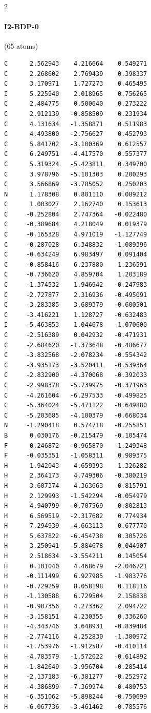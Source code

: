 \begin{multicols}{2}
\paragraph{I2-BDP-0} (65 atoms)
{\scriptsize\linespread{1}\selectfont\begin{verbatim}
C      2.562943    4.216664    0.549271
C      2.268602    2.769439    0.398337
C      3.170971    1.727273    0.465495
I      5.225940    2.018965    0.756265
C      2.484775    0.500640    0.273222
C      2.912139   -0.858509    0.231934
C      4.131634   -1.358871    0.511983
C      4.493800   -2.756627    0.452793
C      5.841702   -3.100369    0.612557
C      6.249751   -4.417570    0.557377
C      5.319324   -5.423811    0.349700
C      3.978796   -5.101303    0.200293
C      3.566869   -3.785052    0.250203
N      1.178308    0.801110    0.089212
C      1.003027    2.162740    0.153613
C     -0.252804    2.747364   -0.022480
C     -0.389684    4.218049    0.019379
C     -0.165328    4.971019   -1.127749
C     -0.287028    6.348832   -1.089396
C     -0.634249    6.983497    0.091404
C     -0.858416    6.237880    1.236591
C     -0.736620    4.859704    1.203189
C     -1.374532    1.946942   -0.247983
C     -2.727877    2.316936   -0.495091
C     -3.283385    3.689379   -0.600501
C     -3.416221    1.128727   -0.632483
I     -5.463853    1.044678   -1.070600
C     -2.516389    0.042932   -0.471931
C     -2.684620   -1.373648   -0.486677
C     -3.832568   -2.078234   -0.554342
C     -3.935173   -3.520411   -0.539364
C     -2.832900   -4.370068   -0.392033
C     -2.998378   -5.739975   -0.371963
C     -4.261604   -6.297533   -0.499825
C     -5.364024   -5.471122   -0.649880
C     -5.203685   -4.100379   -0.668034
N     -1.290418    0.574718   -0.255851
B      0.030176   -0.215479   -0.105474
F      0.246872   -0.965870   -1.249348
F     -0.035351   -1.058311    0.989375
H      1.942043    4.659393    1.326282
H      2.364173    4.749306   -0.380219
H      3.607374    4.363663    0.815791
H      2.129993   -1.542294   -0.054979
H      4.940799   -0.707569    0.802813
H      6.569519   -2.317682    0.774934
H      7.294939   -4.663113    0.677770
H      5.637822   -6.454738    0.305726
H      3.250941   -5.884678    0.044907
H      2.518634   -3.554211    0.145054
H      0.101040    4.468679   -2.046721
H     -0.111499    6.927985   -1.983776
H     -0.729259    8.058198    0.118116
H     -1.130588    6.729504    2.158838
H     -0.907356    4.273362    2.094722
H     -3.158151    4.230355    0.336260
H     -4.343746    3.648931   -0.839484
H     -2.774116    4.252830   -1.380972
H     -1.753976   -1.912587   -0.410114
H     -4.783579   -1.572022   -0.614892
H     -1.842649   -3.956704   -0.285414
H     -2.137183   -6.381277   -0.252972
H     -4.386899   -7.369974   -0.480753
H     -6.351062   -5.898244   -0.750699
H     -6.067736   -3.461462   -0.785576
\end{verbatim}}

\end{multicols}
